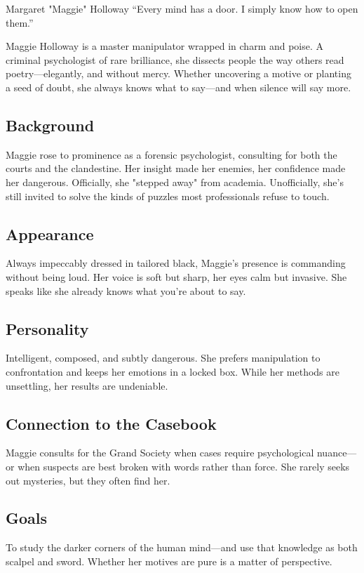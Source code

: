 \begin{WyrdCharacterSheet}
    {Margaret "Maggie" Holloway} 
    {“Every mind has a door. I simply know how to open them.”}
    \label{pc:maggie-holloway}

    Maggie Holloway is a master manipulator wrapped in charm and poise. A criminal psychologist of rare brilliance, she dissects people the way others read poetry—elegantly, and without mercy. Whether uncovering a motive or planting a seed of doubt, she always knows what to say—and when silence will say more.

    \subsection{Background}
    Maggie rose to prominence as a forensic psychologist, consulting for both the courts and the clandestine. Her insight made her enemies, her confidence made her dangerous. Officially, she "stepped away" from academia. Unofficially, she's still invited to solve the kinds of puzzles most professionals refuse to touch.

    \subsection{Appearance}
    Always impeccably dressed in tailored black, Maggie's presence is commanding without being loud. Her voice is soft but sharp, her eyes calm but invasive. She speaks like she already knows what you're about to say.

    \subsection{Personality}
    Intelligent, composed, and subtly dangerous. She prefers manipulation to confrontation and keeps her emotions in a locked box. While her methods are unsettling, her results are undeniable.

    \subsection{Connection to the Casebook}
    Maggie consults for the Grand Society when cases require psychological nuance—or when suspects are best broken with words rather than force. She rarely seeks out mysteries, but they often find her.

    \subsection{Goals}
    To study the darker corners of the human mind—and use that knowledge as both scalpel and sword. Whether her motives are pure is a matter of perspective.


\end{WyrdCharacterSheet}
